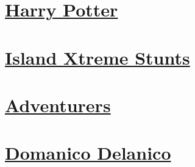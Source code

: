 \section*{\centering \hyperref[contents]{Harry Potter}}\label{image:Harry Potter}
\begin{figure}[H]\begin{flushleft}
\end{flushleft}\end{figure}
\vspace{2.5cm}
\section*{\centering \hyperref[contents]{Island Xtreme Stunts}}\label{image:Island Xtreme Stunts}
\begin{figure}[H]\begin{flushleft}
\end{flushleft}\end{figure}
\vspace{2.5cm}
\section*{\centering \hyperref[contents]{Adventurers}}\label{image:Adventurers}
\begin{figure}[H]\begin{flushleft}
\end{flushleft}\end{figure}
\vspace{2.5cm}
\section*{\centering \hyperref[contents]{Domanico Delanico}}\label{image:Domanico Delanico}
\begin{figure}[H]\begin{flushleft}
\end{flushleft}\end{figure}
